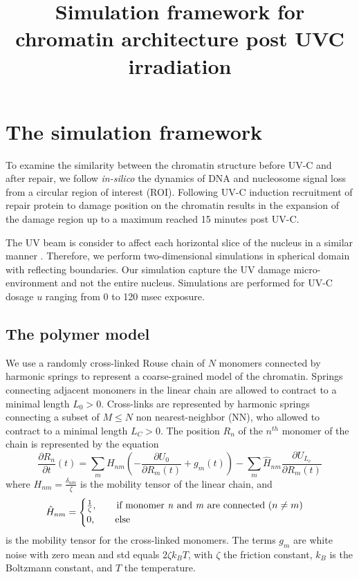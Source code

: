\documentclass[12pt]{article}
\begin{document}
	
	\title{Simulation framework for chromatin architecture post UVC irradiation}
\maketitle
\section{The simulation framework}
	To examine the similarity between the chromatin structure before UV-C and after repair, we follow \textit{in-silico} the dynamics of DNA and nucleosome signal loss from a circular region of interest (ROI). Following UV-C induction recruitment of repair protein to damage position on the chromatin results in the expansion of the damage region up to a maximum reached 15 minutes post UV-C.  
	
	The UV beam is consider to affect each horizontal slice of the nucleus in a similar manner \cite{adam2015imaging}. Therefore, we perform two-dimensional simulations in spherical domain with reflecting boundaries. Our simulation capture the UV damage micro-environment and not the entire nucleus. Simulations are performed for UV-C dosage $u$ ranging from 0 to 120 msec exposure.  

	
	\subsection{The polymer model}
	We use a randomly cross-linked Rouse chain of $N$ monomers connected by harmonic springs \cite{doi1988theory} to represent a coarse-grained model of the chromatin. Springs connecting adjacent monomers in the linear chain are allowed to contract to a minimal length $L_0>0$. Cross-links are represented by harmonic springs connecting a subset of $M\leq N$ non nearest-neighbor (NN), who allowed to contract to a minimal length $L_C>0$.  
	The position $R_n$ of the $n^{th}$ monomer of the chain is  represented by the equation 
	\begin{equation}
	\frac{\partial R_n}{\partial t}(t) = \sum_m H_{nm}\left(-\frac{\partial U_0}{\partial R_m(t)}+g_m(t)\right) -\sum_m \hat{H}_{nm}\frac{\partial U_{L_c}}{\partial R_m (t)}
	\end{equation}
	where $H_{nm}=\frac{\delta_{nm}}{\zeta}$ is the mobility tensor of the linear chain, and 	
	\begin{equation}
	\hat{H}_{nm}= \begin{cases}
	\frac{1}{\zeta},\qquad 
	\text{if monomer \textit{n} and \textit{m} are connected ($n\neq m$)}\\
	0,\qquad \text{else}
	\end{cases}
	\end{equation}
	is the mobility tensor for the cross-linked monomers. 
	The terms $g_m$ are white noise with zero mean and std equals $2\zeta k_BT$, with $\zeta$ the friction constant, $k_B$ is the Boltzmann constant, and $T$ the temperature.  
	
\end{document}
